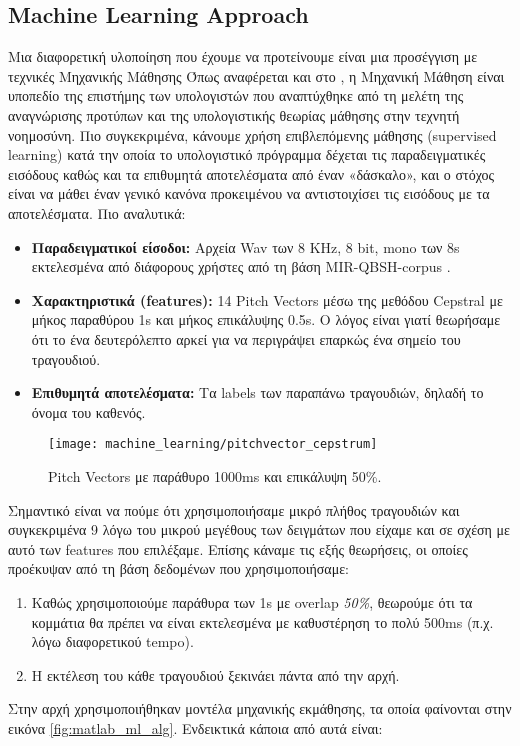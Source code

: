 \subsection{Machine Learning Approach}
Μια διαφορετική υλοποίηση που έχουμε να προτείνουμε είναι μια προσέγγιση με τεχνικές Μηχανικής Μάθησης Όπως αναφέρεται και στο \cite{mldef}, η Μηχανική Μάθηση είναι υποπεδίο της επιστήμης των υπολογιστών που αναπτύχθηκε από τη μελέτη της αναγνώρισης προτύπων και της  υπολογιστικής θεωρίας μάθησης στην τεχνητή νοημοσύνη. Πιο συγκεκριμένα, κάνουμε χρήση επιβλεπόμενης μάθησης (supervised learning) κατά την οποία το υπολογιστικό πρόγραμμα δέχεται τις παραδειγματικές εισόδους καθώς και τα επιθυμητά αποτελέσματα από έναν «δάσκαλο», και ο στόχος είναι να μάθει έναν γενικό κανόνα προκειμένου να αντιστοιχίσει τις εισόδους με τα αποτελέσματα.
Πιο αναλυτικά:
\begin{itemize}
  \item \textbf{Παραδειγματικοί είσοδοι:} Αρχεία Wav των 8 KHz, 8 bit, mono των 8s εκτελεσμένα από διάφορους χρήστες από τη βάση MIR-QBSH-corpus \cite{jang-dataset}.
  \item \textbf{Χαρακτηριστικά (features):} 14 Pitch Vectors μέσω της μεθόδου Cepstral\cite{cepstral} με μήκος παραθύρου 1s και μήκος επικάλυψης 0.5s. Ο λόγος είναι γιατί θεωρήσαμε ότι το ένα δευτερόλεπτο αρκεί για να περιγράψει επαρκώς ένα σημείο του τραγουδιού.
  \item \textbf{Επιθυμητά αποτελέσματα:} Τα labels των παραπάνω τραγουδιών, δηλαδή το όνομα του καθενός.
\end{itemize}

\begin{figure}
        \centering
        \vspace{-20pt}\texttt{[image: machine\_learning/pitchvector\_cepstrum]}
        \vspace{-20pt}\caption{Pitch Vectors με παράθυρο 1000ms και επικάλυψη 50\%.}
        \label{fig:pvcepstrum}
\end{figure}

Σημαντικό είναι να πούμε ότι χρησιμοποιήσαμε μικρό πλήθος τραγουδιών και συγκεκριμένα 9 λόγω του μικρού μεγέθους των δειγμάτων που είχαμε και σε σχέση με αυτό των features που επιλέξαμε. Επίσης κάναμε τις εξής θεωρήσεις, οι οποίες προέκυψαν από τη βάση δεδομένων που χρησιμοποιήσαμε:
\begin{enumerate}
  \item Καθώς χρησιμοποιούμε παράθυρα των 1s με overlap \textit{50\%}, θεωρούμε ότι τα κομμάτια θα πρέπει να είναι εκτελεσμένα με καθυστέρηση το πολύ 500ms (π.χ. λόγω διαφορετικού tempo).
  \item Η εκτέλεση του κάθε τραγουδιού ξεκινάει πάντα από την αρχή.
\end{enumerate}
Στην αρχή χρησιμοποιήθηκαν μοντέλα μηχανικής εκμάθησης, τα οποία φαίνονται στην εικόνα \ref{fig:matlab_ml_alg}. Ενδεικτικά κάποια από αυτά είναι: 

